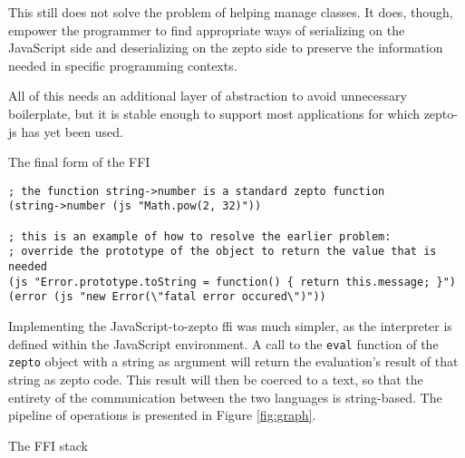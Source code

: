 \documentclass[oneside,11pt,xetex]{scrbook}
\begin{document}
This still does not solve the problem of helping manage classes. It does, though, empower
the programmer to find appropriate ways of serializing on the JavaScript side
and deserializing on the zepto side to preserve the information needed in
specific programming contexts.

All of this needs an additional layer of abstraction to avoid unnecessary
boilerplate, but it is stable enough to support most applications for which zepto-js
has yet been used.

\begin{listing}[H]
\caption{The final form of the FFI}
\begin{verbatim}
; the function string->number is a standard zepto function
(string->number (js "Math.pow(2, 32)"))

; this is an example of how to resolve the earlier problem:
; override the prototype of the object to return the value that is needed
(js "Error.prototype.toString = function() { return this.message; }")
(error (js "new Error(\"fatal error occured\")"))
\end{verbatim}
\label{fig:finalffi}
\end{listing}

Implementing the JavaScript-to-zepto \gls{ffi} was much simpler, as the
interpreter is defined within the JavaScript environment. A call to the
\texttt{eval} function of the \texttt{zepto} object with a string as argument
will return the evaluation's result of that string as zepto code. This result
will then be coerced to a text, so that the entirety of the communication between
the two languages is string-based. The pipeline of operations is presented
in Figure \ref{fig:graph}.

\begin{listing}[H]
\caption{The FFI stack}
\label{fig:graph}
\end{listing}
\end{document}
